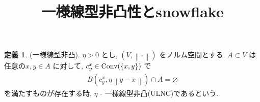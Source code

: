 \documentclass[10pt, fleqn, label-section=none]{bxjsarticle}
\title{一様線型非凸性とsnowflake}
\date{}
\author{}
\theoremstyle{definition}
\newtheorem{dfn}{定義}[section]
\newcommand{\cbra}[1]{\mleft\{#1\mright\}}
\newcommand{\norm}[1]{\left\|#1\right\|}
\renewcommand{\;}{\, ; \,}
\newcommand{\Conv}{\textrm{Conv}}
\begin{document}
\maketitle

\section{}

\begin{dfn}(一様線型非凸). $\eta > 0$ とし, $(V, \norm \cdot)$ をノルム空間とする. $A \subset V$ は 任意の$x, y \in A$ に対して, $c^x_y \in \Conv(\cbra{x, y})$ で
\begin{align*} B(c^x_y, \eta \norm{y- x} ) \cap A = \varnothing \end{align*}
を満たすものが存在する時, $\eta$ - 一様線型非凸(ULNC)であるという. 
\end{dfn}
\end{document}
